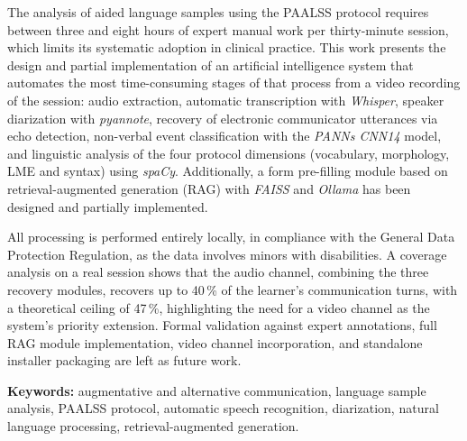 The analysis of aided language samples using the \ac{PAALSS} protocol requires between
three and eight hours of expert manual work per thirty-minute session, which limits its
systematic adoption in clinical practice. This work presents the design and partial
implementation of an artificial intelligence system that automates the most time-consuming
stages of that process from a video recording of the session: audio extraction, automatic
transcription with \emph{Whisper}, speaker diarization with \emph{pyannote}, recovery of
electronic communicator utterances via echo detection, non-verbal event classification
with the \emph{PANNs CNN14} model, and linguistic analysis of the four protocol dimensions
(vocabulary, morphology, \ac{LME} and syntax) using \emph{spaCy}. Additionally, a
form pre-filling module based on retrieval-augmented generation (\ac{RAG}) with
\emph{FAISS} and \emph{Ollama} has been designed and partially implemented.

All processing is performed entirely locally, in compliance with the General Data
Protection Regulation, as the data involves minors with disabilities. A coverage analysis
on a real session shows that the audio channel, combining the three recovery modules,
recovers up to 40\,\% of the learner's communication turns, with a theoretical ceiling
of 47\,\%, highlighting the need for a video channel as the system's priority extension.
Formal validation against expert annotations, full \ac{RAG} module implementation,
video channel incorporation, and standalone installer packaging are left as future work.

\vspace{1em}
\noindent\textbf{Keywords:} augmentative and alternative communication, language sample
analysis, \ac{PAALSS} protocol, automatic speech recognition, diarization, natural
language processing, retrieval-augmented generation.

\cleardoublepage
\thispagestyle{plain}
\vspace*{4cm}
\begin{center}
\Large{}
\end{center}
\vskip0.5cm


